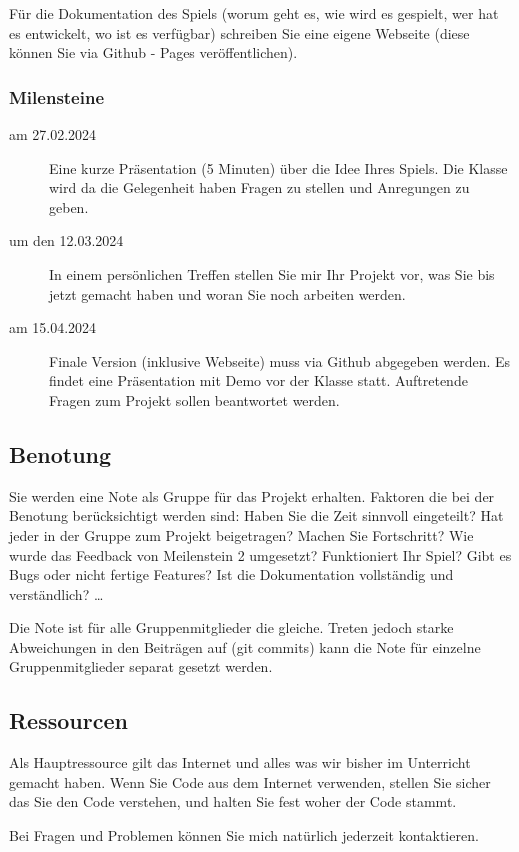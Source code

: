 \documentclass[11pt,a4paper]{report}
\begin{document}
Für die Dokumentation des Spiels (worum geht es, wie wird es gespielt, wer hat
es entwickelt, wo ist es verfügbar) schreiben Sie eine eigene Webseite (diese
können Sie via Github - Pages veröffentlichen).

\subsubsection{Milensteine}
\begin{description}
    \item[am 27.02.2024] Eine kurze Präsentation (5 Minuten) über die Idee
        Ihres Spiels. Die Klasse wird da die Gelegenheit haben Fragen zu
        stellen und Anregungen zu geben.
\item[um den 12.03.2024] In einem persönlichen Treffen stellen Sie mir Ihr
    Projekt vor, was Sie bis jetzt gemacht haben und woran Sie noch arbeiten
        werden.
    \item[am 15.04.2024] Finale Version (inklusive Webseite) muss via Github
        abgegeben werden. Es findet eine Präsentation mit Demo vor der Klasse
        statt. Auftretende Fragen zum Projekt sollen beantwortet werden.
\end{description}

\subsection{Benotung}

Sie werden eine Note als Gruppe für das Projekt erhalten. Faktoren die bei der
Benotung berücksichtigt werden sind: Haben Sie die Zeit sinnvoll eingeteilt?
Hat jeder in der Gruppe zum Projekt beigetragen? Machen Sie Fortschritt? Wie
wurde das Feedback von Meilenstein 2 umgesetzt? Funktioniert Ihr Spiel? Gibt es
Bugs oder nicht fertige Features? Ist die Dokumentation vollständig und
verständlich? \dots

Die Note ist für alle Gruppenmitglieder die gleiche. Treten jedoch starke
Abweichungen in den Beiträgen auf (git commits) kann die Note für einzelne
Gruppenmitglieder separat gesetzt werden.

\newpage

\subsection{Ressourcen}

Als Hauptressource gilt das Internet und alles was wir bisher im Unterricht
gemacht haben. Wenn Sie Code aus dem Internet verwenden, stellen Sie sicher das
Sie den Code verstehen, und halten Sie fest woher der Code stammt.

Bei Fragen und Problemen können Sie mich natürlich jederzeit kontaktieren.
\end{document}
